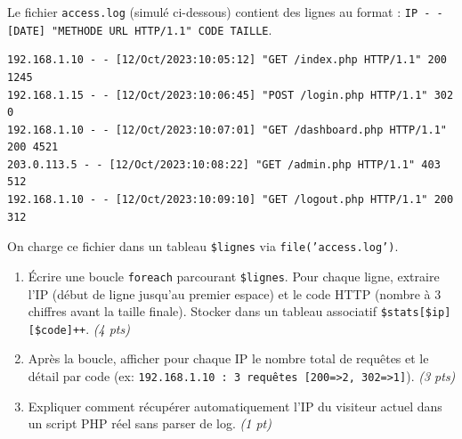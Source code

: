 \documentclass[11pt]{article}
\begin{document}
\begin{exercice}
Le fichier \texttt{access.log} (simulé ci-dessous) contient des lignes au format : \texttt{IP - - [DATE] "METHODE URL HTTP/1.1" CODE TAILLE}.
\begin{verbatim}
192.168.1.10 - - [12/Oct/2023:10:05:12] "GET /index.php HTTP/1.1" 200 1245
192.168.1.15 - - [12/Oct/2023:10:06:45] "POST /login.php HTTP/1.1" 302 0
192.168.1.10 - - [12/Oct/2023:10:07:01] "GET /dashboard.php HTTP/1.1" 200 4521
203.0.113.5 - - [12/Oct/2023:10:08:22] "GET /admin.php HTTP/1.1" 403 512
192.168.1.10 - - [12/Oct/2023:10:09:10] "GET /logout.php HTTP/1.1" 200 312
\end{verbatim}
On charge ce fichier dans un tableau \texttt{\$lignes} via \texttt{file('access.log')}.
\begin{enumerate}
    \item Écrire une boucle \texttt{foreach} parcourant \texttt{\$lignes}. Pour chaque ligne, extraire l'IP (début de ligne jusqu'au premier espace) et le code HTTP (nombre à 3 chiffres avant la taille finale). Stocker dans un tableau associatif \texttt{\$stats[\$ip][\$code]++}. \textit{(4 pts)}
    \item Après la boucle, afficher pour chaque IP le nombre total de requêtes et le détail par code (ex: \texttt{192.168.1.10 : 3 requêtes [200=>2, 302=>1]}). \textit{(3 pts)}
    \item Expliquer comment récupérer automatiquement l'IP du visiteur actuel dans un script PHP réel sans parser de log. \textit{(1 pt)}
\end{enumerate}
\end{exercice}
\end{document}
